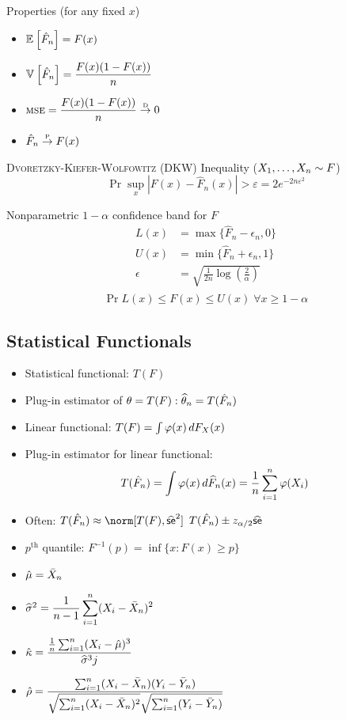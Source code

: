 \documentclass[landscape]{article}
\begin{document}
\begin{multicols*}{2}
Properties (for any fixed $x$)
\begin{itemize}
  \item $\mathbb{E}_{}\left[\hat{F}_n\right] = F(x)$
  \item $\mathbb{V}_{}\left[\hat{F}_n\right] = \displaystyle\frac{F(x)(1-F(x))}{n}$
  \item $\textsc{mse} = \displaystyle\frac{F(x)(1-F(x))}{n} \stackrel{\text{\tiny{D}}}{\rightarrow} 0$
  \item $\hat{F}_n \stackrel{\text{\tiny{P}}}{\rightarrow} F(x)$
\end{itemize}

\textsc{Dvoretzky-Kiefer-Wolfowitz} (DKW) Inequality ($X_1,\dots,X_n\sim F$)
$$\Pr{\sup_x\left|F(x)-\hat{F}_n(x)\right| > \varepsilon} =
  2e^{-2n\varepsilon^2}$$

Nonparametric $1-\alpha$ confidence band for $F$
\begin{align*}
  L(x) &= \max\{\hat{F}_n-\epsilon_n, 0\} \\
  U(x) &= \min\{\hat{F}_n+\epsilon_n, 1\} \\
  \epsilon &= 
    \sqrt{\displaystyle\frac{1}{2n}\log\left( \frac{2}{\alpha} \right)} \\
\end{align*}
$$\Pr{L(x) \le F(x) \le U(x) \;\forall x} \ge 1-\alpha$$

\subsection{Statistical Functionals}

\begin{itemize}
  \item Statistical functional: $T(F)$
  \item Plug-in estimator of $\theta = T(F): \widehat{\theta}_n = T(\hat{F}_n)$
  \item Linear functional: $T(F) = \int \varphi(x)\,dF_X(x)$
  \item Plug-in estimator for linear functional: \\
    $$T(\hat{F}_n) 
      = \displaystyle\int \varphi(x)\,d\widehat{F}_n(x) 
      = \frac{1}{n}\sum_{i=1}^n \varphi(X_i)$$
  \item Often: $T(\hat{F}_n) \approx \norm[T(F),\sehat^2]$ \imp
    $T(\hat{F}_n) \pm z_{\alpha/2}\widehat{\textsf{se}}$
  \item $p^\mathrm{th}$ quantile: $F^{-1}(p) = \inf\{x:F(x) \ge p\}$
  \item $\hat{\mu} = \bar{X}_n$ 
  \item $\widehat{\sigma}^2 = \displaystyle\frac{1}{n-1}\sum_{i=1}^n 
    (X_i-\bar{X}_n)^2$
  \item  $\hat{\kappa} =
    \displaystyle\frac{\frac{1}{n}\sum_{i=1}^n(X_i-\hat{\mu})^3}{\widehat{\sigma}^3j}$
  \item $\hat{\rho} =
    \displaystyle\frac{\sumin(X_i-\samplemean)(Y_i-\bar{Y}_n)}%
    {\sqrt{\sumin(X_i-\samplemean)^2}\sqrt{\sumin(Y_i-\bar{Y}_n)}}$
\end{itemize}


\end{multicols*}
\end{document}
